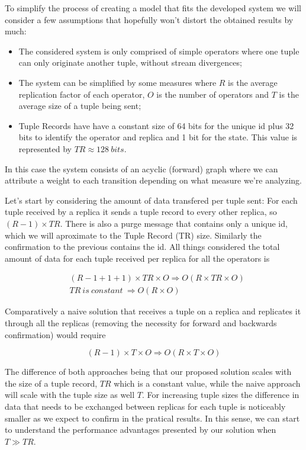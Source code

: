 \documentclass[times, 10pt,twocolumn]{article}
\begin{document}
To simplify the process of creating a model that fits the developed system
we will consider a few assumptions that hopefully won't distort the
obtained results by much: \begin{itemize} \item The considered system is
			only comprised of simple operators where one tuple can only
		originate another tuple, without stream divergences; \item The system
			can be simplified by some measures where $R$ is the average
			replication factor of each operator, $O$ is the number of operators
		and $T$ is the average size of a tuple being sent; \item Tuple Records
			have have a constant size of 64 bits for the unique id plus 32 bits
			to identify the operator and replica and 1 bit for the state.  This
			value is represented by $TR \approx 128\ bits$.  \end{itemize} In
	this case the system consists of an acyclic (forward) graph where we can
	attribute a weight to each transition depending on what measure we're
	analyzing.

Let's start by considering the amount of data transfered per tuple sent:
For each tuple received by a replica it sends a tuple record to every
other replica, so $(R-1)\times TR$. There is also a purge message that
contains only a unique id, which we will aproximate to the Tuple Record
(TR) size. Similarly the confirmation to the previous contains the id. All
things considered the total amount of data for each tuple received per
replica for all the operators is 


\begin{eqnarray*} &(R - 1 + 1 + 1) \times TR \times O \Rightarrow O(R
	\times TR \times O) \\ &TR\ is\ constant\ \Rightarrow O(R \times O)
\end{eqnarray*}

Comparatively a naive solution that receives a tuple on a replica and
replicates it through all the replicas (removing the necessity for forward
and backwards confirmation) would require 

\[ (R-1)\times T \times O \Rightarrow O(R \times T \times O)\]

The difference of both approaches being that our proposed solution scales
with the size of a tuple record, $TR$ which is a constant value, while the
naive approach will scale with the tuple size as well $T$. For increasing
tuple sizes the difference in data that needs to be exchanged between
replicas for each tuple is noticeably smaller as we expect to confirm in
the pratical results. In this sense, we can start to understand the
performance advantages presented by our solution when $T \gg TR$.
\end{document}
